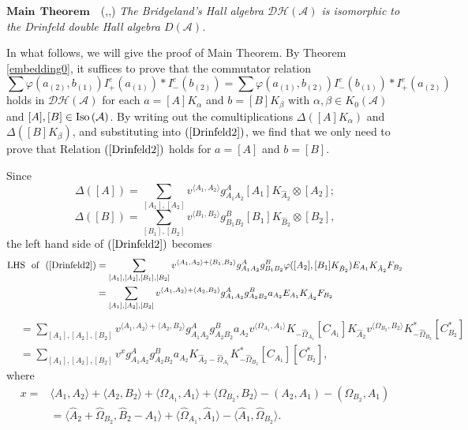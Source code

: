 \documentclass[reqno,12pt]{amsart}
\numberwithin{equation}{section}
\def\lr#1{\langle #1\rangle} \def\fin{\hfill$\square$}  \def\lra{\longrightarrow} \def\Tor{\mbox{\rm Tor}\,}
\def\A{{\mathcal A}}\def\P{{\mathscr{P}}}
\theoremstyle{plain} %
\theoremstyle{definition} %
\begin{document}
\noindent$\mathbf{Main~~Theorem}$~~(\cite{Br},\cite{Yan},\cite{LP})
\emph{The Bridgeland's Hall algebra $\mathcal {D}\mathcal {H}(\mathcal{A})$ is isomorphic to the Drinfeld double Hall algebra $D(\A)$.}

In what follows, we will give the proof of Main Theorem.
By Theorem \ref{embedding0}, it suffices to prove that the commutator relation
\begin{equation}\label{Drinfeld2}\sum\varphi(a_{(2)},b_{(1)})I_+^e(a_{(1)})\ast I_-^e(b_{(2)})=\sum\varphi(a_{(1)},b_{(2)})I_-^e(b_{(1)})\ast I_+^e(a_{(2)})\end{equation} holds in $\mathcal {D}\mathcal {H}(\mathcal{A})$ for each $a=[A]K_{\alpha}$ and $b=[B]K_{\beta}$ with $\alpha,\beta\in K_0(\A)$ and $[A],[B]\in\Iso(\A)$. By writing out the comultiplications $\Delta([A]K_{\alpha})$ and $\Delta([B]K_{\beta})$, and substituting into $(\ref{Drinfeld2})$, we find that we only need to prove that Relation $(\ref{Drinfeld2})$ holds for $a=[A]$ and $b=[B]$.

Since $$\Delta([A])=\sum\limits_{[A_1],[A_2]}v^{\lr{A_1,A_2}}g_{A_1A_2}^A[A_1]K_{\hat{A}_2}\otimes [A_2];$$
$$\Delta([B])=\sum\limits_{[B_1],[B_2]}v^{\lr{B_1,B_2}}g_{B_1B_2}^B[B_1]K_{\hat{B}_2}\otimes [B_2],$$
the left hand side of $(\ref{Drinfeld2})$ becomes
\begin{equation*}\begin{split}
\mbox{LHS~~of}~~(\ref{Drinfeld2})&=\sum\limits_{[A_1],[A_2],[B_1],[B_2]}v^{\lr{A_1,A_2}+\lr{B_1,B_2}}g_{A_1A_2}^A
g_{B_1B_2}^B\varphi([A_2],[B_1]K_{\hat{B}_2})E_{A_1}K_{\hat{A}_2}F_{B_2}\\
&=\sum\limits_{[A_1],[A_2],[B_2]}v^{\lr{A_1,A_2}+\lr{A_2,B_2}}g_{A_1A_2}^A
g_{A_2B_2}^Ba_{A_2}E_{A_1}K_{\hat{A}_2}F_{B_2}
\end{split}\end{equation*}
\begin{equation*}\begin{split}
&=\sum\limits_{[A_1],[A_2],[B_2]}v^{\lr{A_1,A_2}+\lr{A_2,B_2}}g_{A_1A_2}^A
g_{A_2B_2}^Ba_{A_2}v^{\lr{\Omega_{A_1},A_1}}K_{-\hat{\Omega}_{A_1}}[C_{A_1}]K_{\hat{A}_2}v^{\lr{\Omega_{B_2},B_2}}
K_{-\hat{\Omega}_{B_2}}^\ast[C_{B_2}^\ast]\\
&=\sum\limits_{[A_1],[A_2],[B_2]}v^{x}g_{A_1A_2}^A
g_{A_2B_2}^Ba_{A_2}K_{\hat{A}_2-\hat{\Omega}_{A_1}}K_{-\hat{\Omega}_{B_2}}^\ast[C_{A_1}][C_{B_2}^\ast],
\end{split}\end{equation*}
where \begin{equation*}\begin{split}x=&\lr{A_1,A_2}+\lr{A_2,B_2}+\lr{\Omega_{A_1},A_1}+\lr{\Omega_{B_2},B_2}-(A_2,A_1)-(\Omega_{B_2},A_1)\\
&=\lr{\hat{A}_2+\hat{\Omega}_{B_2},\hat{B}_2-\hat{A}_{1}}+\lr{\hat{\Omega}_{A_1},\hat{A}_1}-
\lr{\hat{A}_1,\hat{\Omega}_{B_2}}.
\end{split}\end{equation*}
\end{document}
